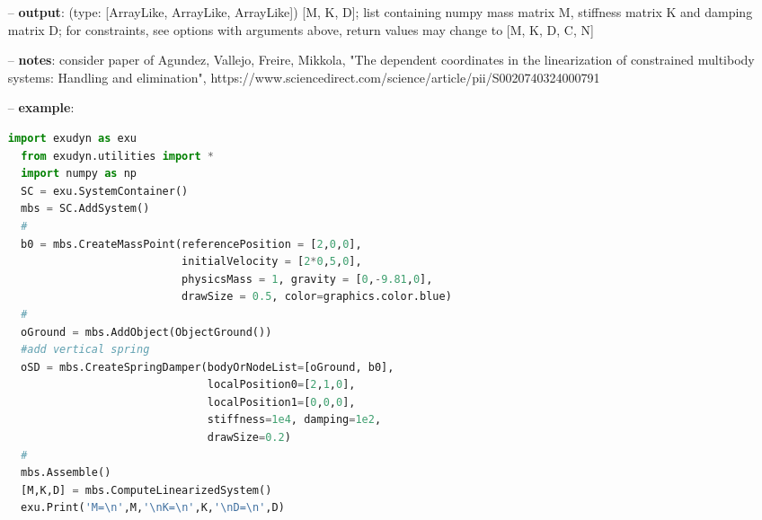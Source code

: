 \begin{itemize}[leftmargin=0.7cm]
\begin{itemize}[leftmargin=1.2cm]
\item[]{\it returnConstraintJacobian}: if True, the returned list contains [M, K, D, C, N] where C is the constraint jacobian and N is the nullspace matrix (may be empty)
\item[]{\it returnConstraintNullspace}: if True, the returned list contains [M, K, D, C, N] where C is the constraint jacobian (may be empty) and N is the nullspace matrix
\item[]{\it autoAssemble}: if True: if mbs.systemIsConsistent=False (system is not assembled), call mbs.Assemble() before solver calls
\end{itemize}
\item[--]
{\bf output}: (type: [ArrayLike, ArrayLike, ArrayLike]) [M, K, D]; list containing numpy mass matrix M, stiffness matrix K and damping matrix D; for constraints, see options with arguments above, return values may change to [M, K, D, C, N]
\item[--]
{\bf notes}: consider paper of Agundez, Vallejo, Freire, Mikkola, "The dependent coordinates in the linearization of constrained multibody systems: Handling and elimination", https://www.sciencedirect.com/science/article/pii/S0020740324000791
\item[--]
{\bf example}: \vspace{-12pt}\ei\begin{lstlisting}[language=Python, xleftmargin=36pt]
  import exudyn as exu
  from exudyn.utilities import *
  import numpy as np
  SC = exu.SystemContainer()
  mbs = SC.AddSystem()
  #
  b0 = mbs.CreateMassPoint(referencePosition = [2,0,0],
                           initialVelocity = [2*0,5,0],
                           physicsMass = 1, gravity = [0,-9.81,0],
                           drawSize = 0.5, color=graphics.color.blue)
  #
  oGround = mbs.AddObject(ObjectGround())
  #add vertical spring
  oSD = mbs.CreateSpringDamper(bodyOrNodeList=[oGround, b0],
                               localPosition0=[2,1,0],
                               localPosition1=[0,0,0],
                               stiffness=1e4, damping=1e2,
                               drawSize=0.2)
  #
  mbs.Assemble()
  [M,K,D] = mbs.ComputeLinearizedSystem()
  exu.Print('M=\n',M,'\nK=\n',K,'\nD=\n',D)
\end{lstlisting}\vspace{-24pt}\bi\item[]\vspace{-24pt}\vspace{12pt}\end{itemize}
%

